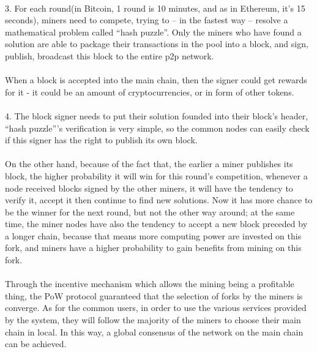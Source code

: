 \documentclass[doublespacing]{bmcart}
\begin{document}
\begin{CJK*}{UTF8}{gbsn}
    \paragraph{}
    3. For each round(in Bitcoin, 1 round is 10 minutes, and as in Ethereum, it’s 15 seconds), miners need to compete, trying to – in the fastest way – resolve a mathematical problem called “hash puzzle”. Only the miners who have found a solution are able to package their transactions in the pool into a block, and sign, publish, broadcast this block to the entire p2p network.
    \paragraph{} 
     When a block is accepted into the main chain, then the signer could get rewards for it -  it could be an amount of cryptocurrencies, or in form of other tokens.
    \paragraph{}    
    4. The block signer needs to put their solution founded into their block’s header, “hash puzzle”’s verification is very simple, so the common nodes can easily check if this signer has the right to publish its own block.
    \paragraph{}
    On the other hand, because of the fact that, the earlier a miner publishes its block, the higher probability it will win for this round’s competition, whenever a node received blocks signed by the other miners, it will have the tendency to verify it, accept it then continue to find new solutions. Now it has more chance to be the winner for the next round, but not the other way around; at the same time, the miner nodes have also the tendency to accept a new block preceded by a longer chain, because that means more computing power are invested on this fork, and miners have a higher probability to gain benefits from mining on this fork.
    \paragraph{}
    Through the incentive mechanism which allows the mining being a profitable thing, the PoW protocol guaranteed that the selection of forks by the miners is converge. As for the common users, in order to use the various services provided by the system, they will follow the majority of the miners to choose their main chain in local. In this way, a global consensus of the network on the main chain can be achieved.

\end{CJK*}
\end{document}
